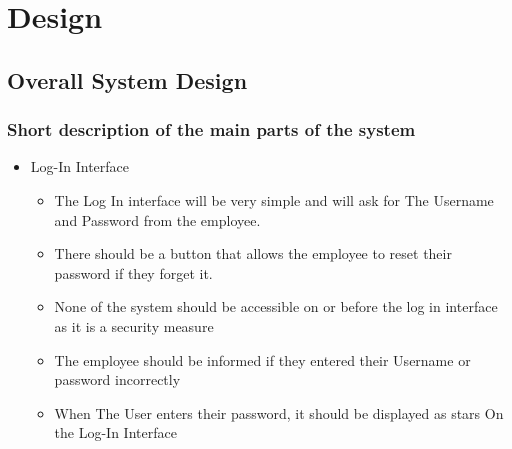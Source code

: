 \chapter{Design}

\section{Overall System Design}

\subsection{Short description of the main parts of the system}

\begin{itemize}
	\item Log-In Interface
	\begin{itemize}
		\item The Log In interface will be very simple and will ask for The Username and Password from the employee.
		\item There should be a button that allows the employee to reset their password if they forget it.
		\item None of the system should be accessible on or before the log in interface as it is a security measure
		\item The employee should be informed if they entered their Username or password incorrectly
		\item When The User enters their password, it should be displayed as stars On the Log-In Interface
	\end{itemize}


\end{itemize}
